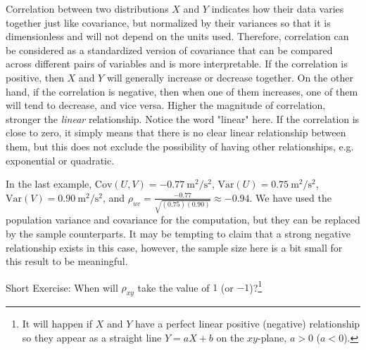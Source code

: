 Correlation between two distributions $X$ and $Y$ indicates how their data varies together just like covariance, but normalized by their variances so that it is dimensionless and will not depend on the units used. Therefore, correlation can be considered as a standardized version of covariance that can be compared across different pairs of variables and is more interpretable. If the correlation is positive, then $X$ and $Y$ will generally increase or decrease together. On the other hand, if the correlation is negative, then when one of them increases, one of them will tend to decrease, and vice versa. Higher the magnitude of correlation, stronger the \textit{linear} relationship. Notice the word "linear" here. If the correlation is close to zero, it simply means that there is no clear linear relationship between them, but this does not exclude the possibility of having other relationships, e.g. exponential or quadratic.\par
In the last example, $\text{Cov}(U,V) = \SI{-0.77}{\square\m \per \square\s}$, $\text{Var}(U) = \SI{0.75}{\square\m \per \square\s}$, $\text{Var}(V) = \SI{0.90}{\square\m \per \square\s}$, and $\rho_{uv} = \frac{-0.77}{\sqrt{(0.75)(0.90)}} \approx -0.94$. We have used the population variance and covariance for the computation, but they can be replaced by the sample counterparts. It may be tempting to claim that a strong negative relationship exists in this case, however, the sample size here is a bit small for this result to be meaningful. \par
Short Exercise: When will $\rho_{xy}$ take the value of $1$ (or $-1$)?\footnote{It will happen if $X$ and $Y$ have a perfect linear positive (negative) relationship so they appear as a straight line $Y = aX + b$ on the $xy$-plane, $a > 0$ ($a < 0$).}\par

